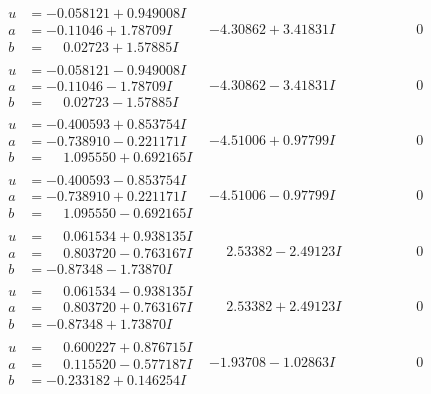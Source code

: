 \documentclass[1p]{elsarticle_modified}
\theoremstyle{definition}
\begin{document}
$$\begin{array}{c|c|c}
\begin{aligned}
u &= -0.058121 + 0.949008 I \\
a &= -0.11046 + 1.78709 I \\
b &= \phantom{-}0.02723 + 1.57885 I\end{aligned}
 & -4.30862 + 3.41831 I & \phantom{-0.000000 } 0 \\ \hline\begin{aligned}
u &= -0.058121 - 0.949008 I \\
a &= -0.11046 - 1.78709 I \\
b &= \phantom{-}0.02723 - 1.57885 I\end{aligned}
 & -4.30862 - 3.41831 I & \phantom{-0.000000 } 0 \\ \hline\begin{aligned}
u &= -0.400593 + 0.853754 I \\
a &= -0.738910 - 0.221171 I \\
b &= \phantom{-}1.095550 + 0.692165 I\end{aligned}
 & -4.51006 + 0.97799 I & \phantom{-0.000000 } 0 \\ \hline\begin{aligned}
u &= -0.400593 - 0.853754 I \\
a &= -0.738910 + 0.221171 I \\
b &= \phantom{-}1.095550 - 0.692165 I\end{aligned}
 & -4.51006 - 0.97799 I & \phantom{-0.000000 } 0 \\ \hline\begin{aligned}
u &= \phantom{-}0.061534 + 0.938135 I \\
a &= \phantom{-}0.803720 - 0.763167 I \\
b &= -0.87348 - 1.73870 I\end{aligned}
 & \phantom{-}2.53382 - 2.49123 I & \phantom{-0.000000 } 0 \\ \hline\begin{aligned}
u &= \phantom{-}0.061534 - 0.938135 I \\
a &= \phantom{-}0.803720 + 0.763167 I \\
b &= -0.87348 + 1.73870 I\end{aligned}
 & \phantom{-}2.53382 + 2.49123 I & \phantom{-0.000000 } 0 \\ \hline\begin{aligned}
u &= \phantom{-}0.600227 + 0.876715 I \\
a &= \phantom{-}0.115520 - 0.577187 I \\
b &= -0.233182 + 0.146254 I\end{aligned}
 & -1.93708 - 1.02863 I & \phantom{-0.000000 } 0 \\ \hline\begin{aligned}

\end{aligned}
\end{array}$$
\end{document}
